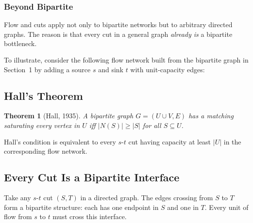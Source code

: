 \documentclass[11pt]{article}
\newtheorem{theorem}{Theorem}
\begin{document}
\subsubsection{Beyond Bipartite}

Flow and cuts apply not only to bipartite networks but to
arbitrary directed graphs.  The reason is that every cut in a
general graph \emph{already is} a bipartite bottleneck.

To illustrate, consider the following flow network built from the
bipartite graph in Section~1 by adding a source $s$ and sink $t$
with unit-capacity edges:

\begin{center}
\end{center}


\subsection{Hall's Theorem}

\begin{theorem}[Hall, 1935]
A bipartite graph $G = (U \cup V, E)$ has a matching saturating
every vertex in $U$ iff $|N(S)| \ge |S|$ for all
$S \subseteq U$.
\end{theorem}

Hall's condition is equivalent to every $s$-$t$ cut having
capacity at least $|U|$ in the corresponding flow network.

\subsection{Every Cut Is a Bipartite Interface}

Take any $s$-$t$ cut $(S, T)$ in a directed graph.  The edges
crossing from $S$ to $T$ form a bipartite structure: each has
one endpoint in $S$ and one in $T$.  Every unit of flow from $s$
to $t$ must cross this interface.
\end{document}
